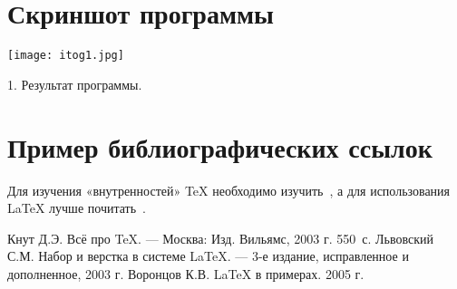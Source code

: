 \documentclass[12pt,a4paper]{scrartcl}
\begin{document}
\section{Скриншот программы}
\label{sec:intro}
\centering
\texttt{[image: itog1.jpg]}
\caption{1. Результат программы.}\label{fig:par}
\section{Пример библиографических ссылок}

Для изучения «внутренностей» \TeX{} необходимо 
изучить~\cite{Knuth-2003}, а для использования \LaTeX{} лучше
почитать~\cite{Lvovsky-2003, Voroncov-2005}.

\begin{thebibliography}{9}
Кнут Д.Э. Всё про \TeX. \newblock --- Москва: Изд. Вильямс, 2003 г. 550~с.
Львовский С.М. Набор и верстка в системе \LaTeX{}. \newblock --- 3-е издание, исправленное и дополненное, 2003 г.
Воронцов К.В. \LaTeX{} в примерах. 2005 г.
\end{thebibliography}
\end{document}
